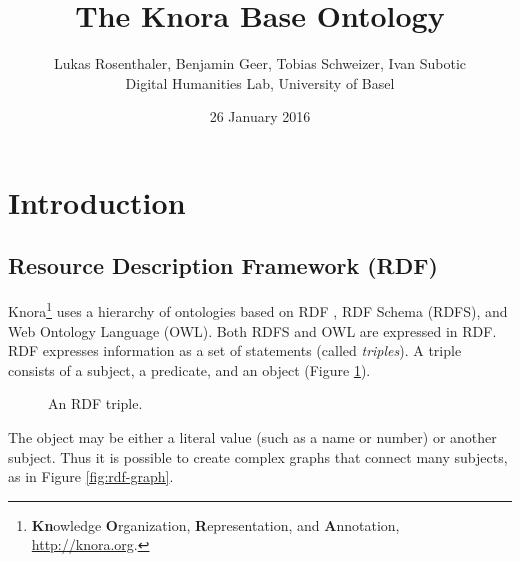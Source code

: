 \documentclass[12pt, a4paper]{article}
\title{The Knora Base Ontology}
\author{Lukas Rosenthaler, Benjamin Geer, Tobias Schweizer, Ivan Subotic\\Digital Humanities Lab, University of Basel}
\date{26 January 2016}
\begin{document}
\maketitle

\listoftodos

\tableofcontents

\section{Introduction}

\subsection{Resource Description Framework (RDF)}
Knora\footnote{{\bf Kn}owledge {\bf O}rganization, {\bf R}epresentation, and {\bf A}nnotation, \url{http://knora.org}.} uses a hierarchy of ontologies based on RDF \cite{RDF_Primer_1_1}, RDF Schema (RDFS)\cite{RDF_Schema_1_1}, and Web Ontology Language (OWL)\cite{OWL_2_Primer}. Both RDFS and OWL are expressed in RDF. RDF expresses information as a set of statements (called {\em triples}). A triple consists of a subject, a predicate, and an object (Figure \ref{fig:rdf-triple}).

\begin{figure}[h]
\centering
{}
\caption{An RDF triple.}
\label{fig:rdf-triple}
\end{figure}

The object may be either a literal value (such as a name or number) or another subject. Thus it is possible to create complex graphs that connect many subjects, as in Figure \ref{fig:rdf-graph}.
\end{document}
